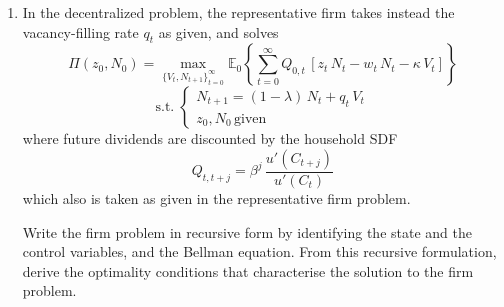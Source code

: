 \documentclass[dvipsnames,11pt]{article}
\begin{document}
\begin{enumerate}
\begin{solution}
                    
                    
                \end{solution}

            \item In the decentralized problem, the representative firm takes instead the vacancy-filling rate $q_t$ as given, and solves
            $$ \Pi(z_0,N_0) = \max_{\{V_t,N_{t+1}\}_{t=0}^\infty}\mathbb{E}_0\left\{\sum_{t=0}^\infty Q_{0,t}\,\left[z_t\,N_t - w_t\,N_t - \kappa\,V_t\right]\right\} $$
            $$ \mathrm{s.t.}\; 
            \begin{cases}
            N_{t+1} = (1-\lambda)\,N_t + q_t\,V_t	\\
            z_0,N_0\,\text{given}
            \end{cases}
            $$
            where future dividends are discounted by the household SDF
            $$ Q_{t,t+j} = \beta^j\,\frac{u'(C_{t+j})}{u'(C_t)} $$
            which also is taken as given in the representative firm problem.
            
            Write the firm problem in recursive form by identifying the state and the control variables, and the Bellman equation. From this recursive formulation, derive the optimality conditions that characterise the solution to the firm problem.


\end{enumerate}
\end{document}
